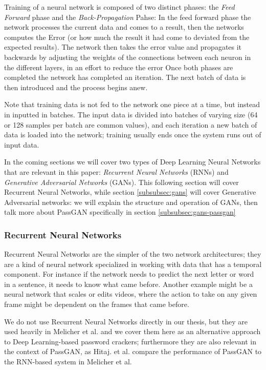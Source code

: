Training of a neural network is composed of two distinct phases: the \emph{Feed Forward} phase and the \emph{Back-Propagation} Pahse: In the feed forward phase the network processes the current data and comes to a result, then the networks computes the Error (or how much the result it had come to deviated from the expected results). The network then takes the error value and propagates it backwards by adjusting 
the weights of the connections between each neuron in the different layers, in an effort to reduce the error
Once both phases are completed the network has completed an iteration. The next batch of data is then introduced and the process begins anew.

Note that training data is not fed to the network one piece at a time, but instead in inputted in batches. The input data is divided into batches of varying size (64 or 128 samples per batch are common values), and each iteration a new batch of data is loaded into the network; training usually ends once the system runs out of input data.

In the coming sections we will cover two types of Deep Learning Neural Networks that are relevant in this paper: \emph{Recurrent Neural Networks} (RNNs) and  \emph{Generative Adversarial Networks} (GANs).
This following section will cover Recurrent Neural Networks, while section \ref{subsubsec:gans} will cover Generative Adversarial networks: we will explain the structure and operation of GANs, then talk more about PassGAN specifically in section \ref{subsubsec:gans-passgan}

\subsubsection{Recurrent Neural Networks}
Recurrent Neural Networks are the simpler of the two network architectures; they are a kind of neural network specialized in working with data that has a temporal component.
For instance if the network needs to predict the next letter or word in a sentence, it needs to know what came before. Another example might be a neural network that scales or edits videos, where the action to take on any given frame might be dependent on the frames that came before.

We do not use Recurrent Neural Networks directly in our thesis, but they are used heavily in Melicher et al. \cite{Melicher2016} and we cover them here as an alternative approach to Deep Learning-based password crackers; furthermore they are also relevant in the context of PassGAN, as Hitaj. et al. \cite{PassGAN} compare the performance of PassGAN to the RNN-based system in Melicher et al.

